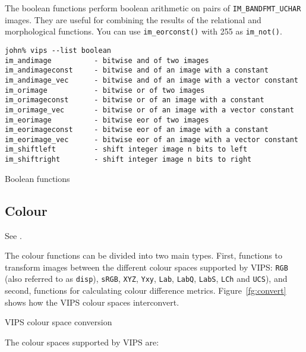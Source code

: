 The boolean functions perform boolean arithmetic on pairs of
\verb+IM_BANDFMT_UCHAR+ images. They are useful for combining the results of
the relational and morphological functions. You can use 
\verb+im_eorconst()+ with 255 as \verb+im_not()+.

\begin{fig2}
\begin{verbatim}
john% vips --list boolean
im_andimage          - bitwise and of two images
im_andimageconst     - bitwise and of an image with a constant
im_andimage_vec      - bitwise and of an image with a vector constant
im_orimage           - bitwise or of two images
im_orimageconst      - bitwise or of an image with a constant
im_orimage_vec       - bitwise or of an image with a vector constant
im_eorimage          - bitwise eor of two images
im_eorimageconst     - bitwise eor of an image with a constant
im_eorimage_vec      - bitwise eor of an image with a vector constant
im_shiftleft         - shift integer image n bits to left
im_shiftright        - shift integer image n bits to right
\end{verbatim}
\caption{Boolean functions}
\label{fg:boolean}
\end{fig2}

\subsection{Colour}
\label{sec:colour}

See .

The colour functions can be divided into two main types. First, functions to
transform images between the different colour spaces supported by VIPS:
\verb+RGB+ (also referred to as \verb+disp+), \verb+sRGB+,  \verb+XYZ+,
\verb+Yxy+, \verb+Lab+, \verb+LabQ+, \verb+LabS+, \verb+LCh+ and
\verb+UCS+), and second, functions for calculating colour difference
metrics. Figure~\ref{fg:convert} shows how the VIPS colour spaces
interconvert.

\begin{fig2}
\caption{VIPS colour space conversion}
\label{fg:convert}
\end{fig2}

The colour spaces supported by VIPS are:

